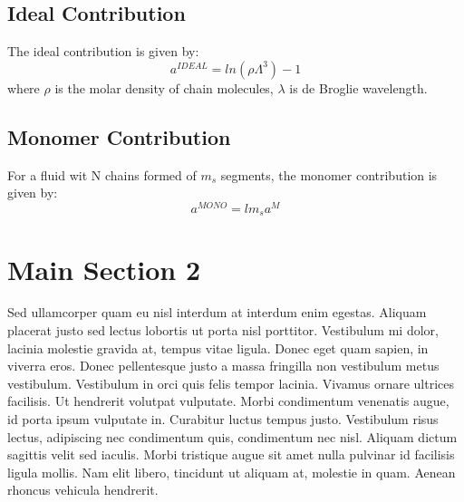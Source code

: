 \subsection{Ideal Contribution}

The ideal contribution is given by:
\begin{equation}
a^{IDEAL} = ln(\rho\Lambda^3) -1
\label{eqn:aideal}
\end{equation}
where $\rho$ is the molar density of chain molecules, $\lambda$ is de Broglie wavelength. 

\subsection{Monomer Contribution}
For a fluid wit N chains formed of $m_s$ segments, the monomer contribution is given by:
\begin{equation}
a^{MONO} = lm_sa^M
\label{eqn:amonomer}
\end{equation}

\section{Main Section 2}

Sed ullamcorper quam eu nisl interdum at interdum enim egestas. Aliquam placerat justo sed lectus lobortis ut porta nisl porttitor. Vestibulum mi dolor, lacinia molestie gravida at, tempus vitae ligula. Donec eget quam sapien, in viverra eros. Donec pellentesque justo a massa fringilla non vestibulum metus vestibulum. Vestibulum in orci quis felis tempor lacinia. Vivamus ornare ultrices facilisis. Ut hendrerit volutpat vulputate. Morbi condimentum venenatis augue, id porta ipsum vulputate in. Curabitur luctus tempus justo. Vestibulum risus lectus, adipiscing nec condimentum quis, condimentum nec nisl. Aliquam dictum sagittis velit sed iaculis. Morbi tristique augue sit amet nulla pulvinar id facilisis ligula mollis. Nam elit libero, tincidunt ut aliquam at, molestie in quam. Aenean rhoncus vehicula hendrerit.
